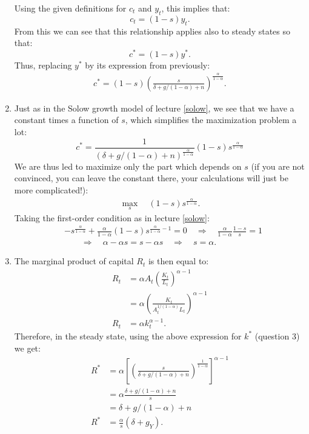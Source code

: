 \documentclass[]{book}
\begin{document}
\begin{enumerate}
  Using the given definitions for \(c_t\) and \(y_t\), this implies
  that: \[c_t = (1-s)y_t.\] From this we can see that this relationship
  applies also to steady states so that: \[c^{*} = (1-s)y^{*}.\] Thus,
  replacing \(y^{*}\) by its expression from previously: \[
  \begin{aligned}
  \boxed{c^{*}=(1-s)\left(\frac{s}{\delta+g/(1-\alpha)+n}\right)^{\frac{\alpha}{1-\alpha}}}.
  \end{aligned}
  \]
\item
  Just as in the Solow growth model of lecture \ref{solow}, we see that
  we have a constant times a function of \(s\), which simplifies the
  maximization problem a lot:
  \[c^{*}=\frac{1}{\left(\delta+g/(1-\alpha)+n\right)^{\frac{\alpha}{1-\alpha}}} (1-s)s^{\frac{\alpha}{1-\alpha}}\]
  We are thus led to maximize only the part which depends on \(s\) (if
  you are not convinced, you can leave the constant there, your
  calculations will just be more complicated!): \[
  \begin{aligned}
  \max_s \quad  (1-s)s^{\frac{\alpha}{1-\alpha}}.
  \end{aligned}
  \] Taking the first-order condition as in lecture \ref{solow}: \[
  \begin{aligned}
  &-s^{\frac{\alpha}{1-\alpha}}+\frac{\alpha}{1-\alpha}(1-s)s^{\frac{\alpha}{1-\alpha}-1} =0 \quad \Rightarrow\quad\frac{\alpha}{1-\alpha}\frac{1-s}{s}=1\\
  &\quad \quad \Rightarrow\quad\alpha-\alpha s=s-\alpha s \quad\Rightarrow\quad\boxed{s=\alpha}.
  \end{aligned}
  \]
\item
  The marginal product of capital \(R_t\) is then equal to: \[
  \begin{aligned}
  R_t&=\alpha A_t \left(\frac{K_t}{L_t}\right)^{\alpha-1}\\
  &=\alpha \left(\frac{K_t}{A_t^{1/(1-\alpha)} L_t}\right)^{\alpha-1}\\
  R_t&=\alpha k_t^{\alpha-1}.
  \end{aligned}
  \] Therefore, in the steady state, using the above expression for
  \(k^{*}\) (question 3) we get: \[
  \begin{aligned}
  R^{*}&=\alpha \left[\left(\frac{s}{\delta + g/(1-\alpha)+n}\right)^{\frac{1}{1-\alpha}}\right]^{\alpha-1}\\
  &=\alpha \frac{\delta + g/(1-\alpha)+n}{s}\\
  &=\delta + g/(1-\alpha)+n\\
  R^{*}&=\frac{\alpha}{s}\left(\delta + g_Y\right).

\end{aligned}\]
\end{enumerate}
\end{document}
